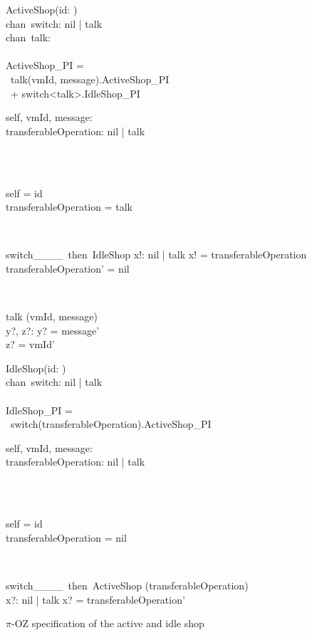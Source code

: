 \begin{figure}[H]
\centering
\begin{sidebyside}
\begin{class}{ActiveShop(id: \integer)}
\ 
\\chan\ switch: nil | talk
\ 
\\chan\ talk:\integer \times \integer
\ \\ \
\\ActiveShop\_PI = 
\\ \ talk(vmId, message).ActiveShop\_PI
\\ \ + switch<talk>.IdleShop\_PI
\\\begin{state}
self, vmId, message: \integer
\\transferableOperation: nil | talk
\end{state} 
\\
\begin{init}
\\self = id
\\transferableOperation = talk
\end{init} 
\\
\begin{op}{switch\_\_\_\_\ then\ IdleShop}
x!: nil | talk
\ST
x! = transferableOperation
\\transferableOperation' = nil
\end{op}
\\
\begin{op}{talk}
\Delta (vmId, message)
\\y?, z?: \integer
\ST
y? = message'
\\z? = vmId'
\end{op}
\end{class}
\nextside
\begin{class}{IdleShop(id: \integer)}
\ 
\\chan\ switch: nil | talk
\ \\ \
\\IdleShop\_PI = 
\\ \  switch(transferableOperation).ActiveShop\_PI
\\
\begin{state}
self, vmId, message: \integer
\\transferableOperation: nil | talk
\end{state} 
\\
\begin{init}
\\self = id
\\transferableOperation = nil
\end{init} 
\\
\begin{op}{switch\_\_\_\_\ then\ ActiveShop}
\Delta (transferableOperation)
\\x?: nil | talk
\ST
x? = transferableOperation'
\end{op}
\end{class}
\end{sidebyside}
\caption{$\pi$-OZ specification of the active and idle shop}
\label{comp_oz_pi_statefull_shop}
\end{figure}